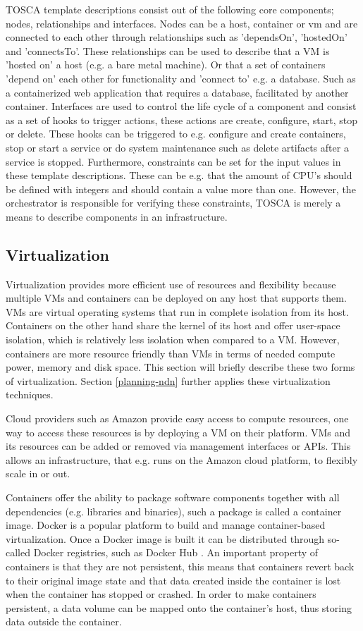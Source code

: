 TOSCA template descriptions consist out of the following core components; nodes, relationships and interfaces. Nodes can be a host, container or \gls{vm} and are connected to each other through relationships such as 'dependsOn', 'hostedOn' and 'connectsTo'. These relationships can be used to describe that a VM is 'hosted on' a host (e.g. a bare metal machine). Or that a set of containers 'depend on' each other for functionality and 'connect to' e.g. a database. Such as a containerized web application that requires a database, facilitated by another container. Interfaces are used to control the life cycle of a component and consist as a set of hooks to trigger actions, these actions are create, configure, start, stop or delete. These hooks can be triggered to e.g. configure and create containers, stop or start a service or do system maintenance such as delete artifacts after a service is stopped. Furthermore, constraints can be set for the input values in these template descriptions. These can be e.g. that the amount of CPU's should be defined with integers and should contain a value more than one. However, the orchestrator is responsible for verifying these constraints, TOSCA is merely a means to describe components in an infrastructure.

\subsection{Virtualization}
\label{overview-virtualization}
Virtualization provides more efficient use of resources and flexibility because multiple VMs and containers can be deployed on any host that supports them. VMs are virtual operating systems that run in complete isolation from its host. Containers on the other hand share the kernel of its host and offer user-space isolation, which is relatively less isolation when compared to a VM. However, containers are more resource friendly than VMs in terms of needed compute power, memory and disk space. This section will briefly describe these two forms of virtualization. Section \ref{planning-ndn} further applies these virtualization techniques.

Cloud providers such as Amazon provide easy access to compute resources, one way to access these resources is by deploying a VM on their platform. VMs and its resources can be added or removed via management interfaces or APIs. This allows an infrastructure, that e.g. runs on the Amazon cloud platform, to flexibly scale in or out.

Containers offer the ability to package software components together with all dependencies (e.g. libraries and binaries), such a package is called a container image. Docker is a popular platform to build and manage container-based virtualization. Once a Docker image is built it can be distributed through so-called Docker registries, such as Docker Hub \cite{dockerhub-website}. An important property of containers is that they are not persistent, this means that containers revert back to their original image state and that data created inside the container is lost when the container has stopped or crashed. In order to make containers persistent, a data volume can be mapped onto the container's host, thus storing data outside the container.

